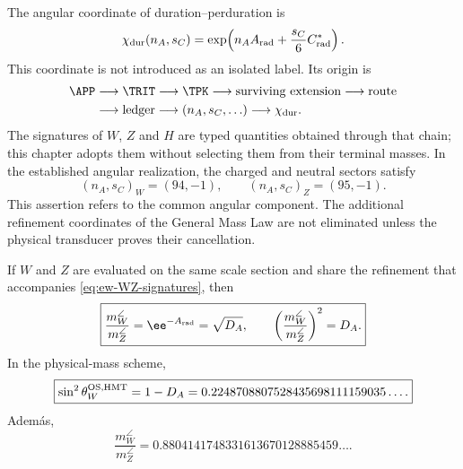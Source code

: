 The angular coordinate of duration--perduration is
\begin{equation}
\label{eq:ew-angular-character}
\chi_{\rm dur}(n_A,s_C)
=\exp\!\left(n_AA_{\rm rad}
+\frac{s_C}{6}C^*_{\rm rad}\right).
\end{equation}
This coordinate is not introduced as an isolated label. Its origin is
\begin{equation}
\label{eq:ew-signature-provenance}
\begin{aligned}
\APP&\longrightarrow\TRIT\longrightarrow\TPK
\longrightarrow\text{surviving extension}
\longrightarrow\text{route}\\
&\longrightarrow\text{ledger}
\longrightarrow(n_A,s_C,\ldots)
\longrightarrow\chi_{\rm dur}.
\end{aligned}
\end{equation}
The signatures of \(W\), \(Z\) and \(H\) are typed quantities obtained through
that chain; this chapter adopts them without selecting them from
their terminal masses. In the established angular realization, the
charged and neutral sectors satisfy
\begin{equation}
\label{eq:ew-WZ-signatures}
(n_A,s_C)_W=(94,-1),
\qquad
(n_A,s_C)_Z=(95,-1).
\end{equation}
This assertion refers to the common angular component. The
additional refinement coordinates of the General Mass Law are not
eliminated unless the physical transducer proves their cancellation.

\begin{theorem}
\label{thm:ew-weinberg}
If \(W\) and \(Z\) are evaluated on the same scale section and share
the refinement that accompanies \cref{eq:ew-WZ-signatures}, then
\begin{equation}
\label{eq:ew-WZ-ratio}
\boxed{
\frac{m_W^{\angle}}{m_Z^{\angle}}
=\ee^{-A_{\rm rad}}=\sqrt{D_A},
\qquad
\left(\frac{m_W^{\angle}}{m_Z^{\angle}}\right)^2=D_A.}
\end{equation}
In the physical-mass scheme,
\begin{equation}
\label{eq:ew-sin2thetaW}
\boxed{
\sin^2\theta_W^{\rm OS,HMT}=1-D_A
=0.2248708807528435698111159035\ldots .}
\end{equation}
Adem\'as,
\begin{equation}
\label{eq:ew-WZ-terminal-ratio}
\frac{m_W^{\angle}}{m_Z^{\angle}}
=0.8804141748331613670128885459\ldots .
\end{equation}
\end{theorem}

